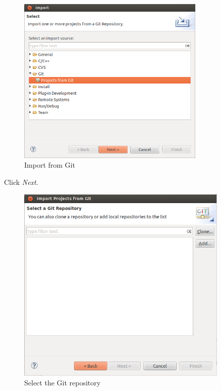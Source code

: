 \documentclass[a4paper, 10pt]{article}
\begin{document}
    \begin{figure}[H]
    \centering
        \includegraphics[width=0.8\textwidth]{./install-guide-linux-images/test-prj-git.png}
        \caption{Import from Git}
        \label{fig:test-prj-git}
    \end{figure}

Click \emph{Next}.

    \begin{figure}[H]
    \centering
        \includegraphics[width=0.9\textwidth]{./install-guide-linux-images/test-select-git-repo.png}
        \caption{Select the Git repository}
        \label{fig:test-select-git-repo}
    \end{figure}
\end{document}

